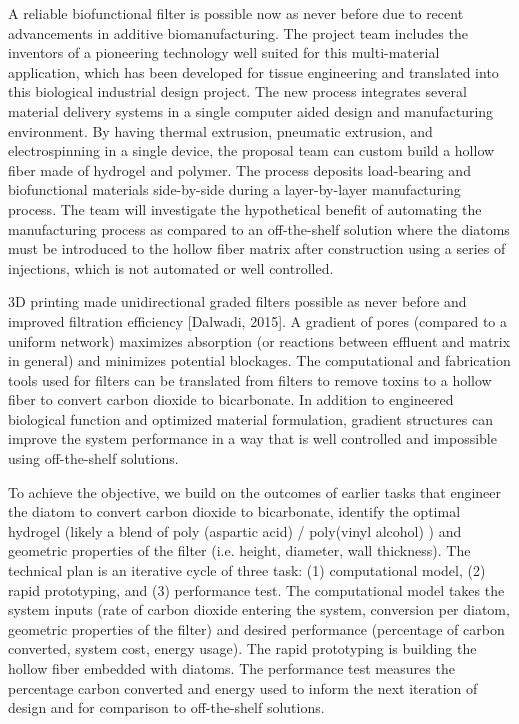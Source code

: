 \documentclass[a4paper,11pt]{article}
\begin{document}
A reliable biofunctional filter is possible now as never before due to recent advancements in additive biomanufacturing. The project team includes the inventors of a pioneering technology well suited for this multi-material application, which has been developed for tissue engineering and translated into this biological industrial design project. The new process integrates several material delivery systems in a single computer aided design and manufacturing environment. By having thermal extrusion, pneumatic extrusion, and electrospinning in a single device, the proposal team can custom build a hollow fiber made of hydrogel and polymer. The process deposits load-bearing and biofunctional materials side-by-side during a layer-by-layer manufacturing process. The team will investigate the hypothetical benefit of automating the manufacturing process as compared to an off-the-shelf solution where the diatoms must be introduced to the hollow fiber matrix after construction using a series of injections, which is not automated or well controlled. 

3D printing made unidirectional graded filters possible as never before and improved filtration efficiency [Dalwadi, 2015]. A gradient of pores (compared to a uniform network) maximizes absorption (or reactions between effluent and matrix in general) and minimizes potential blockages. The computational and fabrication tools used for filters can be translated from filters to remove toxins to a hollow fiber to convert carbon dioxide to bicarbonate. In addition to engineered biological function and optimized material formulation, gradient structures can improve the system performance in a way that is well controlled and impossible using off-the-shelf solutions.

To achieve the objective, we build on the outcomes of earlier tasks that engineer the diatom to convert carbon dioxide to bicarbonate, identify the optimal hydrogel (likely a blend of poly (aspartic acid) / poly(vinyl alcohol) ) and geometric properties of the filter (i.e. height, diameter, wall thickness).
The technical plan is an iterative cycle of three task: (1) computational model,  (2) rapid prototyping, and (3) performance test. The computational model takes the system inputs (rate of carbon dioxide entering the system, conversion per diatom, geometric properties of the filter) and desired performance (percentage of carbon converted, system cost, energy usage). The rapid prototyping is building the hollow fiber embedded with diatoms. The performance test measures the percentage carbon converted and energy used to inform the next iteration of design and for comparison to off-the-shelf solutions. 
\end{document}
